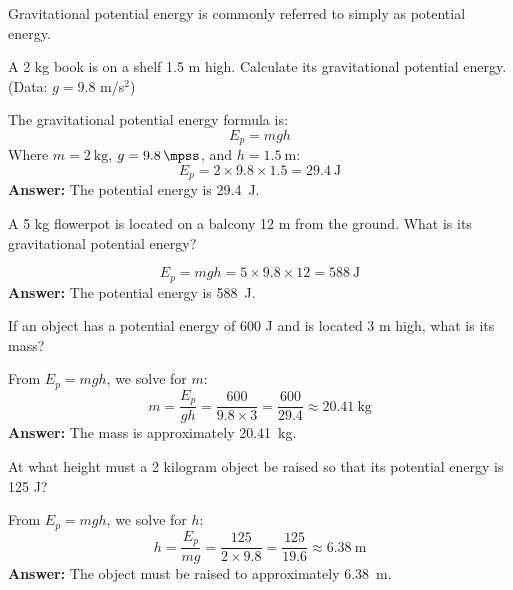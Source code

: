 \begin{remark}
    Gravitational potential energy is commonly referred to simply as potential energy.
\end{remark}



\begin{exercise}
    A 2 kg book is on a shelf 1.5 m high. Calculate its gravitational potential energy. (Data: $g = 9.8$ m/s$^2$)
    \begin{solu}
        The gravitational potential energy formula is:
        \[
            E_p = mgh
        \]
        Where $m = \qty{2}{\kilo\gram}$, $g = \qty{9.8}{\mpss}$, and $h = \qty{1.5}{\metre}$:
        \[
            E_p = 2 \times 9.8 \times 1.5 = \qty{29.4}{\joule}
        \]
        \textbf{Answer:} The potential energy is \qty{29.4}{\joule}.
    \end{solu}
\end{exercise}

\begin{exercise}
    A 5 kg flowerpot is located on a balcony 12 m from the ground. What is its gravitational potential energy?
    \begin{solu}
        \[
            E_p = mgh = 5 \times 9.8 \times 12 = \qty{588}{\joule}
        \]
        \textbf{Answer:} The potential energy is \qty{588}{\joule}.
    \end{solu}
\end{exercise}

\begin{exercise}
    If an object has a potential energy of 600 J and is located 3 m high, what is its mass?
    \begin{solu}
        From $E_p = mgh$, we solve for $m$:
        \[
            m = \frac{E_p}{gh} = \frac{600}{9.8 \times 3} = \frac{600}{29.4} \approx \qty{20.41}{\kilo\gram}
        \]
        \textbf{Answer:} The mass is approximately \qty{20.41}{\kilo\gram}.
    \end{solu}
\end{exercise}

\begin{exercise}
    At what height must a 2 kilogram object be raised so that its potential energy is 125 J?
    \begin{solu}
        From $E_p = mgh$, we solve for $h$:
        \[
            h = \frac{E_p}{mg} = \frac{125}{2 \times 9.8} = \frac{125}{19.6} \approx \qty{6.38}{\metre}
        \]
        \textbf{Answer:} The object must be raised to approximately \qty{6.38}{\metre}.
    \end{solu}
\end{exercise}


